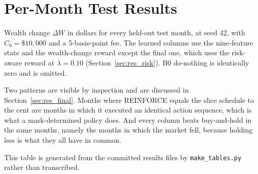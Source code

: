 \chapter{Per-Month Test Results}
\label{app:permonth}

Wealth change $\Delta W$ in dollars for every held-out test month, at
seed 42, with $C_0 = \$10{,}000$ and a 5-basis-point fee. The
learned columns use the nine-feature state and the wealth-change reward
except the final one, which uses the risk-aware reward at
$\lambda = 0.10$ (Section~\ref{sec:res_risk}). B0 do-nothing is
identically zero and is omitted.

Two patterns are visible by inspection and are discussed in
Section~\ref{sec:res_final}. Months where REINFORCE equals the slice
schedule to the cent are months in which it executed an identical
action sequence, which is what a mask-determined policy does. And every
column beats buy-and-hold in the same months, namely the months in which
the market fell, because holding less is what they all have in common.

This table is generated from the committed results files by
\texttt{make\_tables.py} rather than transcribed.

